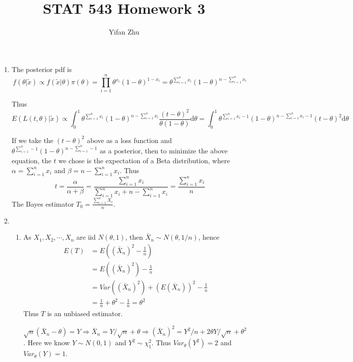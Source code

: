 \documentclass{article}
\begin{document}
	

	
	\title{STAT 543 Homework 3}
	\author{Yifan Zhu}
	\maketitle
	
	\begin{enumerate}[leftmargin = 0 em, label = \arabic*., font = \bfseries]
	\item 
		The posterior pdf is
		\[f(\theta | \tilde{x}) \propto f(\tilde{x}| \theta) \pi(\theta) = \prod_{i=1}^n \theta^{x_i} (1 - \theta)^{1-x_i} = \theta^{\sum_{i=1}^n x_i} (1 - \theta)^{n - \sum_{i=1}^n x_i}\]

		Thus 
		\[E(L(t,\theta)| \tilde{x}) \propto \int_{0}^1 \theta^{\sum_{i=1}^n x_i} (1 - \theta)^{n - \sum_{i=1}^n x_i} \frac{(t - \theta)^2}{\theta (1 - \theta)} \mathrm{d}\theta = \int_{0}^1 \theta^{\sum_{i=1}^n x_i -1} (1 - \theta)^{n - \sum_{i=1}^n x_i - 1} (t - \theta)^2 \mathrm{d}\theta\]

		If we take the $(t - \theta)^2$ above as a loss function and $\theta^{\sum_{i=1}^n - 1} (1 - \theta)^{n - \sum_{i=1}^n - 1}$ as a posterior, then to minimize the above equation, the $t$ we chose is the expectation of a Beta distribution, where $\alpha = \sum_{i=1}^n x_i$ and $\beta = n - \sum_{i=1}^n x_i$. Thus
		\[t = \frac{\alpha}{\alpha + \beta} = \frac{\sum_{i=1}^n x_i}{\sum_{i=1}^n x_i + n - \sum_{i=1}^n x_i} = \frac{\sum_{i=1}^n x_i}{n}\]
		The Bayes estimator $T_0 = \frac{\sum_{i=1}^n X_i}{n}$.
 	
 	\item 
 	\begin{enumerate}
 		\item 
 		As $X_1, X_2, \cdots , X_n$ are iid $N(\theta, 1)$, then $\bar{X}_n \sim N(\theta , 1/n)$, hence
 		\begin{align*}
 		E(T) &= E((\bar{X}_n)^2 - \frac{1}{n}) \\
 		&= E((\bar{X}_n)^2) - \frac{1}{n} \\
 		&= Var((\bar{X}_n)^2) + (E(\bar{X}_n))^2 - \frac{1}{n} \\
 		&= \frac{1}{n} + \theta^2 - \frac{1}{n} = \theta^2
 		\end{align*}
 		Thus $T$ is an unbiased estimator.

 		$\sqrt{n} (\bar{X}_n - \theta) = Y \Rightarrow \bar{X}_n = Y/\sqrt{n} + \theta \Rightarrow (\bar{X}_n )^2 = Y^2/n + 2 \theta Y / \sqrt{n} + \theta^2 $. Here we know $Y \sim N(0,1)$ and $Y^2 \sim \chi_{1}^2$. Thus $Var_{\theta} (Y^2) = 2$ and $Var_{\theta} (Y) = 1$.


\end{enumerate}
\end{enumerate}
\end{document}
